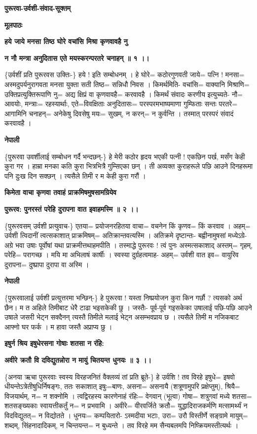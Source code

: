 \documentclass[11pt, a5paper]{article}
\begin{document}
\textbf{पुरूरवा-उर्वशी-संवाद-सूक्तम्}

\textbf{मूलपाठः}

\textbf{हये जाये मनसा तिष्ठ घोरे वचांसि मिश्रा कृणवावहै नु}

\textbf{न नौ मन्त्रा अनुदितास एते मयस्करन्परतरे चनाहन् ॥ १ ।।}

\{उर्वशीं प्रति पुरूरवस उक्तिः-\} हये ! इति सम्बोधनम् । हे घोरे= कठोरगुणवती जाये= पत्नि ! मनसा= अस्मदुपर्यनुरागवता मनसा युक्ता सती तिष्ठ= सन्निधौ निवस । किमर्थमिति- वचांसि= वाक्यानि मिश्राणि= उक्तिप्रत्युक्तिरूपाणि नु= अद्य क्षिप्रं वा कृणवावहै= करवावहै । किमर्थं संवादः करणीय इत्युच्यते-  नौ= आवयोः, मन्त्राः= रहस्यार्थाः, एते=विवक्षिताः अनुदितासः= परस्परमभाष्यमाणा गुम्फिताः सन्तः परतरे= आगामिनि चनाहन्= अनेकेषु दिवसेषु मयः= सुखम्, न करन्= न कुर्वन्ति । तस्मात् परस्परं संवादं करवावहै ।

\textbf{नेपाली}

\{पुरूरवा उवर्शीलाई सम्बोधन गर्दै भन्दछन्-\} हे मेरी कठोर हृदय भएकी पत्नी ! एकछिन पर्ख, मसँग केही कुरा गर । हाम्रा मनका कति कुरा भित्रभित्रै गुम्सिएका छन् । ती अव्यक्त कुराहरूले पछि आउने दिनहरूमा पनि दुःख दिन सक्छन् । त्यसैले तिमी र म केही कुरा गरौं ।

\textbf{किमेता वाचा कृणवा तवाहं प्राक्रमिषमुषसामग्रियेव}

\textbf{पुरूरव: पुनरस्तं परेहि दुरापना वात इवाहमस्मि ॥ २ ।।}

\{पुरूरवसम् उर्वशी प्रत्युवाच-\} एतया= प्रयोजनरहितया वाचा= वचनेन किं कृणव= किं करवाव । अहम्= उर्वशी त्विदानीं त्वत्सकाशात् प्राक्रमिषम्= अतिक्रान्तवत्यस्मि । अतिक्रमे दृष्टान्तः- बह्वीनामुषसां मध्येऽग्रे-अग्रे भवा उषाः पूर्वोषां यथा प्राक्रमीत्तथाहमपीति । तस्माद्धे पुरूरवः ! त्वं पुनः अस्मत्सकाशाद् अस्तम्= गृहम्, परेहि= परागच्छ । मयि मा अभिलाषं कार्षीः । स्वस्या दुर्ग्रहत्वमाह- अहम्= उर्वशी वात इव= वायुरिव दुरापना= दुष्प्रापा दुरापा वा अस्मि ।

\textbf{नेपाली}

\{पुरूरवालाई उर्वशी प्रत्युत्तरमा भन्छिन्-\} हे पुरूरवा ! यस्ता निष्प्रयोजन कुरा किन गर्छौ ? त्यसको अर्थ छैन। म त अहिले तिमीबाट धेरै टाढा भइसकेकी छु । जस्तैः- पूर्व-पूर्व गइसकेका उषालाई पछि-पछि आउने उषाले जसरी भेट्न सक्दैनन् त्यस्तै तिमीले मलाई भेट्न असम्भवप्राय छ । त्यसैले तिमी म नजिकबाट आफ्नो घर फर्क । म हावा जस्तै अप्राप्य छु ।

\textbf{इषुर्न श्रिय इषुधेरसना गोषाः शतसा न रंहि:}

\textbf{अवीरे क्रतौ वि दविद्युतन्नोरा न मायुं चितयन्त धुनयः ॥ ३ ।।}

\{अनया ऋचा पुरूरवाः स्वस्य विरहजनितं वैक्लव्यं तां प्रति ब्रूते-\} हे उर्वशि ! तव विरहे इषुधे= इषवो धीयन्तेऽत्रेतीषुधिर्निषङ्गः, ततः सकाशात् इषुः=बाणः, असना= असनायै (शत्रूणामुपरि प्रक्षेप्तुम्), श्रियै= विजयार्थम्, न= न शक्नोमि । त्वद्विरहस्य कारणेनाहं रंहिः= वेगवान् (भूत्वा) गोषा= शत्रुगवां मध्ये शतसा= शतसङ्‌ख्यकाः स्वायत्तीकर्तुं न= न प्रभवामि । अवीरे= वीरवर्जिते क्रतौ= युद्धादिराजकर्मणि मत्सामर्थ्यं न विदविद्युतत्= न विद्योतते । धुनयः= कम्पयितारो- ऽस्मदीया भटाः, उरा= उरौ विस्तीर्णे सङ्‌ग्रामे मायुम्= शब्दम्, सिंहनादादिकम्, न चिन्तयन्त= न बुध्यन्ते । तव विरहे मम सैन्यबलमपि निष्क्रियमस्तीत्यर्थः ।
\end{document}
